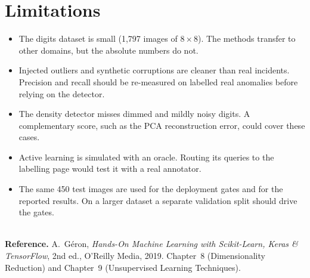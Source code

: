 \documentclass[11pt,a4paper]{article}
\begin{document}
\section{Limitations}
\begin{itemize}[leftmargin=1.2em]
  \item The digits dataset is small (1,797 images of $8\times8$). The methods transfer to other domains, but the
        absolute numbers do not.
  \item Injected outliers and synthetic corruptions are cleaner than real incidents. Precision and recall should be
        re-measured on labelled real anomalies before relying on the detector.
  \item The density detector misses dimmed and mildly noisy digits. A complementary score, such as the PCA
        reconstruction error, could cover these cases.
  \item Active learning is simulated with an oracle. Routing its queries to the labelling page would test it with a
        real annotator.
  \item The same 450 test images are used for the deployment gates and for the reported results. On a larger
        dataset a separate validation split should drive the gates.
\end{itemize}

\vspace{1em}
\noindent{\color{tealhead}\rule{\linewidth}{0.6pt}}\\
\textbf{Reference.} A.~Géron, \emph{Hands-On Machine Learning with Scikit-Learn, Keras \& TensorFlow}, 2nd ed.,
O'Reilly Media, 2019. Chapter~8 (Dimensionality Reduction) and Chapter~9 (Unsupervised Learning Techniques).
\end{document}
